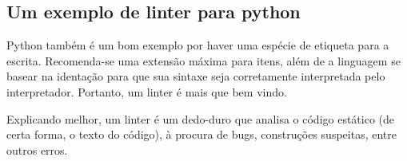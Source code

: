 
\subsection{Um exemplo de linter para python}
Python também é um bom exemplo por haver uma espécie de etiqueta para a escrita.
Recomenda-se uma extensão máxima para itens, além de a linguagem se basear na identação
para que sua sintaxe seja corretamente interpretada pelo interpretador.
Portanto, um linter é mais que bem vindo.


Explicando melhor, um linter é um dedo-duro que analisa o código estático (de certa forma, o texto do código),
à procura de bugs, construções suspeitas, entre outros erros.

\newpage
